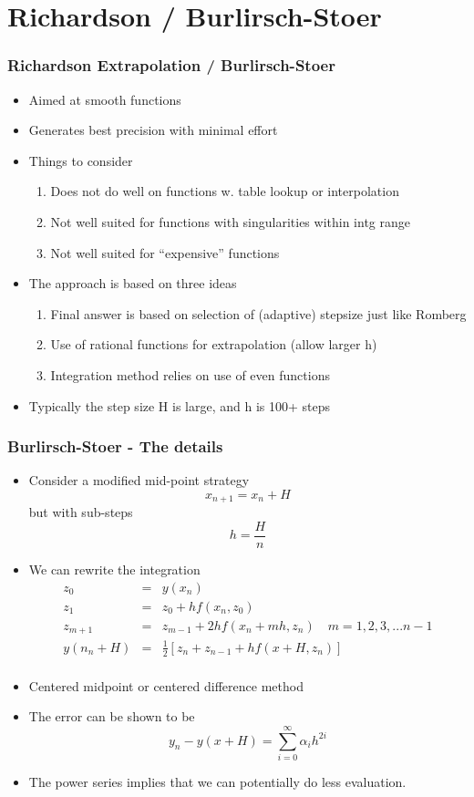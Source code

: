 \documentclass[10pt]{beamer}
\begin{document}
\section{Richardson / Burlirsch-Stoer}

\begin{frame}
  \frametitle{Richardson Extrapolation / Burlirsch-Stoer}
  \begin{itemize}
  \item Aimed at smooth functions 
  \item Generates best precision with minimal effort
  \item Things to consider
    \begin{enumerate}
    \item Does not do well on functions w. table lookup or interpolation
    \item Not well suited for functions with singularities within intg range
    \item Not well suited for ``expensive'' functions
    \end{enumerate}
  \item The approach is based on three ideas
    \begin{enumerate}
    \item Final answer is based on selection of (adaptive) stepsize just like Romberg
    \item Use of rational functions for extrapolation (allow larger h)
    \item Integration method relies on use of even functions
    \end{enumerate}
  \item Typically the step size H is large, and h is 100+ steps
  \end{itemize}
\end{frame}

\begin{frame}
  \frametitle{Burlirsch-Stoer - The details}
  \begin{itemize}
  \item Consider a modified mid-point strategy
    \[
      x_{n+1} = x_n + H
    \] but with sub-steps
    \[
      h = \frac{H}{n}
    \]
  \item We can rewrite the integration
    \[
      \begin{array}{rcl}
        z_0 & = & y(x_n)\\
        z_1 & = & z_0 + h f( x_n, z_0 )\\
        z_{m+1} & = & z_{m-1} + 2h f(x_{n} + mh, z_n) \mbox{~~~} m = 1, 2, 3, ...{n-1}\\
        y(n_n + H) & = & \frac{1}{2} [ z_n + z_{n-1} + h f(x+H, z_n) ] \\ 
      \end{array}
    \]
  \item Centered midpoint or centered difference method
  \item The error can be shown to be
    \[
      y_n - y(x+H) = \sum_{i=0}^{\infty} \alpha_i h^{2i}
    \]
  \item The power series implies that we can potentially do less evaluation. 
  \end{itemize}
\end{frame}
\end{document}

